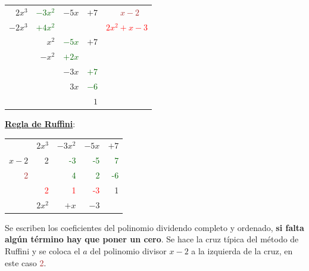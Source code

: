 \vspace{5mm}
\begin{multicols}{2}
\begin{table}[H]
\centering
\begin{tabular}{rrrrr}
$2x^3$ & \textcolor{DarkGreen}{$-3x^2$} & $-5x$ & \multicolumn{1}{r|}{$+7$} & \textcolor{Brown}{$ x-2 \quad $} \\ \cline{5-5} 
$-2x^3$ & \textcolor{DarkGreen}{$+4x^2$} &  &  & \textcolor{red}{$2x^2+x-3$} \\ \cline{1-2}
 & $x^2$ & \textcolor{DarkGreen}{$-5x$} & $+7$ &  \\
 & $-x^2$ & \textcolor{DarkGreen}{$+2x$} &  &  \\ \cline{2-3}
 &  & $-3x$ & \textcolor{DarkGreen}{$+7$} &  \\
 &  & $3x$ & \textcolor{DarkGreen}{$-6$} &  \\ \cline{3-4}
 &  &  & \textcolor{NavyBlue}{$1$} & 
\end{tabular}
\end{table}
\begin{center}\textbf{\underline{Regla de Ruffini}}: \end{center}
	
\begin{table}[H]
\centering
\begin{tabular}{rrrrr}
 & \textcolor{gris}{$2x^3$} & \textcolor{gris}{$-3x^2$} & \textcolor{gris}{$-5x$} & \textcolor{gris}{$+7$} \\
\multicolumn{1}{r|}{\textcolor{gris}{$x-\boxed{2}$}} & 2 & \textcolor{DarkGreen}{-3} & \textcolor{DarkGreen}{-5} & \textcolor{DarkGreen}{7} \\
\multicolumn{1}{r|}{\textcolor{Brown}{2}} &  & \textcolor{DarkGreen}{4} & \textcolor{DarkGreen}{2} & \textcolor{DarkGreen}{-6} \\ \hline
\multicolumn{1}{r|}{} & \textcolor{red}{2} & \textcolor{red}{1} & \multicolumn{1}{r|}{\textcolor{red}{-3}} & \textcolor{NavyBlue}{1} \\ \cline{5-5} 
 & \textcolor{gris}{$2x^2$} & \textcolor{gris}{$+x$} & \textcolor{gris}{$-3$} & 
\end{tabular}
\end{table}
\end{multicols}

Se escriben los coeficientes del polinomio dividendo completo y ordenado, \textbf{si falta algún término hay que poner un cero}. Se hace la cruz típica del método de Ruffini y se coloca el $a$ del polinomio divisor $x-2$ a la izquierda de la cruz, en este caso \textcolor{Brown}{2}.


